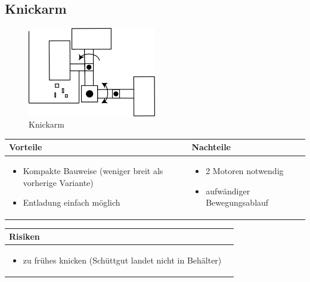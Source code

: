 \pagebreak


\subsection{Knickarm}
\begin{figure} [hbp]
	\centering
	\includegraphics[width=0.5\textwidth]{fig/Beladen_2.png}
	\caption{Knickarm}
\end{figure}


\begin{table}[h]
\begin{tabular}{p{} | p{}}


 \textbf{Vorteile} & \textbf{Nachteile} \\ \hline
	 
\begin{itemize}
\item Kompakte Bauweise (weniger breit als vorherige Variante)
\item Entladung einfach möglich 
\end{itemize}

 
 &
 
\begin{itemize}
\item 2 Motoren notwendig
\item aufwändiger Bewegungsablauf
\end{itemize}

\end{tabular}
\end{table}

\begin{table}[h]
\begin{tabular}{p{}p{}}


 \textbf{Risiken} & \\ \hline
	 
\begin{itemize}
\item zu frühes knicken (Schüttgut landet nicht in Behälter) 
\end{itemize}
 
\end{tabular}
\end{table}

\pagebreak